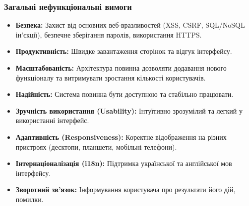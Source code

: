 \subsubsection{Загальні нефункціональні вимоги}
\begin{itemize}
    \item \textbf{Безпека:} Захист від основних веб-вразливостей (XSS, CSRF, SQL/NoSQL ін'єкції), безпечне зберігання паролів, використання HTTPS.
    \item \textbf{Продуктивність:} Швидке завантаження сторінок та відгук інтерфейсу.
    \item \textbf{Масштабованість:} Архітектура повинна дозволяти додавання нового функціоналу та витримувати зростання кількості користувачів.
    \item \textbf{Надійність:} Система повинна бути доступною та стабільно працювати.
    \item \textbf{Зручність використання (Usability):} Інтуїтивно зрозумілий та легкий у використанні інтерфейс.
    \item \textbf{Адаптивність (Responsiveness):} Коректне відображення на різних пристроях (десктопи, планшети, мобільні телефони).
    \item \textbf{Інтернаціоналізація (i18n):} Підтримка української та англійської мов інтерфейсу.
    \item \textbf{Зворотний зв'язок:} Інформування користувача про результати його дій, помилки.
\end{itemize} 
